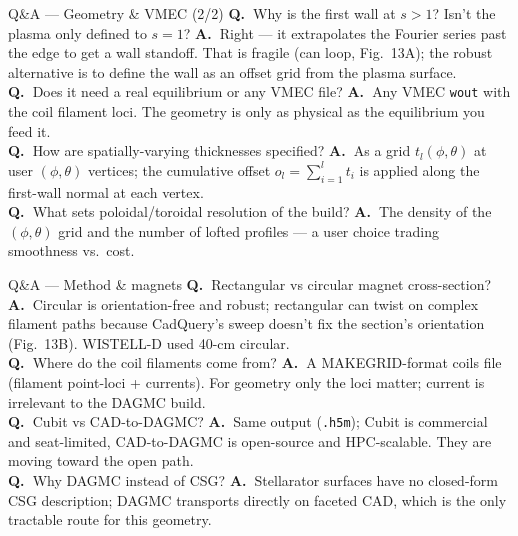 \documentclass[aspectratio=169]{beamer}
\newcommand{\q}[1]{\textbf{\color{key}Q.\ }#1}
\newcommand{\an}[1]{\textbf{A.\ }#1}
\begin{document}
\begin{frame}{Q\&A --- Geometry \& VMEC (2/2)}
  \small
  \q{Why is the first wall at $s>1$? Isn't the plasma only defined to $s=1$?} \an{Right --- it extrapolates the Fourier series past the edge to get a wall standoff. That is fragile (can loop, Fig.~13A); the robust alternative is to define the wall as an offset grid from the plasma surface.}\\[2pt]
  \q{Does it need a real equilibrium or any VMEC file?} \an{Any VMEC \texttt{wout} with the coil filament loci. The geometry is only as physical as the equilibrium you feed it.}\\[2pt]
  \q{How are spatially-varying thicknesses specified?} \an{As a grid $t_l(\phi,\theta)$ at user $(\phi,\theta)$ vertices; the cumulative offset $o_l=\sum_{i=1}^l t_i$ is applied along the first-wall normal at each vertex.}\\[2pt]
  \q{What sets poloidal/toroidal resolution of the build?} \an{The density of the $(\phi,\theta)$ grid and the number of lofted profiles --- a user choice trading smoothness vs.\ cost.}
\end{frame}

\begin{frame}{Q\&A --- Method \& magnets}
  \small
  \q{Rectangular vs circular magnet cross-section?} \an{Circular is orientation-free and robust; rectangular can twist on complex filament paths because CadQuery's sweep doesn't fix the section's orientation (Fig.~13B). WISTELL-D used 40-cm circular.}\\[2pt]
  \q{Where do the coil filaments come from?} \an{A MAKEGRID-format coils file (filament point-loci + currents). For geometry only the loci matter; current is irrelevant to the DAGMC build.}\\[2pt]
  \q{Cubit vs CAD-to-DAGMC?} \an{Same output (\texttt{.h5m}); Cubit is commercial and seat-limited, CAD-to-DAGMC is open-source and HPC-scalable. They are moving toward the open path.}\\[2pt]
  \q{Why DAGMC instead of CSG?} \an{Stellarator surfaces have no closed-form CSG description; DAGMC transports directly on faceted CAD, which is the only tractable route for this geometry.}
\end{frame}
\end{document}
